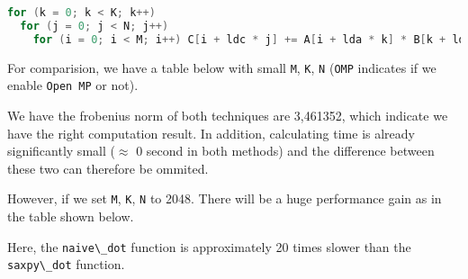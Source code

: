 \documentclass[
  12pt,
  xcolor = usenames,dvipsnames]{article}
\newcommand{\passthrough}[1]{#1}
\begin{document}
\begin{lstlisting}[language=C]
for (k = 0; k < K; k++)
  for (j = 0; j < N; j++)
    for (i = 0; i < M; i++) C[i + ldc * j] += A[i + lda * k] * B[k + ldb * j];
\end{lstlisting}

For comparision, we have a table below with small \passthrough{\lstinline!M!}, \passthrough{\lstinline!K!}, \passthrough{\lstinline!N!} (\passthrough{\lstinline!OMP!} indicates if we enable \passthrough{\lstinline!Open MP!} or not).

\begin{table}[!h]
\centering
{}
\end{table}

We have the frobenius norm of both techniques are 3,461352, which indicate we have the right computation result. In addition, calculating time is already significantly small (\(\approx\) 0 second in both methods) and the difference between these two can therefore be ommited.

However, if we set \passthrough{\lstinline!M!}, \passthrough{\lstinline!K!}, \passthrough{\lstinline!N!} to 2048. There will be a huge performance gain as in the table shown below.

\begin{table}[!h]
\centering
{}
\end{table}

Here, the \passthrough{\lstinline!naive\_dot!} function is approximately 20 times slower than the \passthrough{\lstinline!saxpy\_dot!} function.
\end{document}
